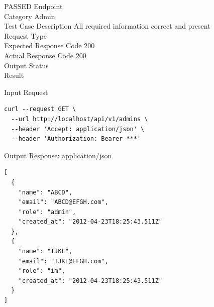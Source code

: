 \begin{testcase}{22}{PASSED}
Endpoint \hfill {}\\
Category \hfill Admin\\
Test Case Description \hfill All required information correct and present\\

Request Type    \hfill {}\\
Expected Response Code    \hfill 200\\
Actual Response Code    \hfill 200\\

Output Status \hfill {}\\
Result \hfill {}

\begin{ipblock}{Input Request}
\begin{verbatim}
curl --request GET \
  --url http://localhost/api/v1/admins \
  --header 'Accept: application/json' \
  --header 'Authorization: Bearer ***'
\end{verbatim}
\end{ipblock}

\begin{opblock}{Output Response: application/json}
\begin{verbatim}
[
  {
    "name": "ABCD",
    "email": "ABCD@EFGH.com",
    "role": "admin",
    "created_at": "2012-04-23T18:25:43.511Z"
  },
  {
    "name": "IJKL",
    "email": "IJKL@EFGH.com",
    "role": "im",
    "created_at": "2012-04-23T18:25:43.511Z"
  }
]
\end{verbatim}
\end{opblock}
\end{testcase}

